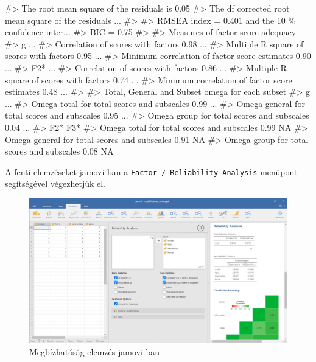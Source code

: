 \documentclass[
  letterpaper,
]{krantz}
\makeatletter
\newenvironment{Shaded}{\begin{snugshade}}{\end{snugshade}}
\newcommand{\CommentTok}[1]{\textcolor[rgb]{0.37,0.37,0.37}{#1}}
\newenvironment{kframe}{%
\medskip{}
\setlength{\fboxsep}{.8em}
 \def\at@end@of@kframe{}%
 \ifinner\ifhmode%
  \def\at@end@of@kframe{\end{minipage}}%
  \begin{minipage}{\columnwidth}%
 \fi\fi%
 \def\FrameCommand##1{\hskip\@totalleftmargin \hskip-\fboxsep
 \colorbox{shadecolor}{##1}\hskip-\fboxsep
     \hskip-\linewidth \hskip-\@totalleftmargin \hskip\columnwidth}%
 \MakeFramed {\advance\hsize-\width
   \@totalleftmargin\z@ \linewidth\hsize
   \@setminipage}}%
 {\par\unskip\endMakeFramed%
 \at@end@of@kframe}
\renewenvironment{Shaded}{\begin{kframe}}{\end{kframe}}
\makeatother
\begin{document}
\begin{Shaded}
\begin{Highlighting}[]
\CommentTok{\#\textgreater{} The root mean square of the residuals is  0.05 }
\CommentTok{\#\textgreater{} The df corrected root mean square of the residuals ...}
\CommentTok{\#\textgreater{} }
\CommentTok{\#\textgreater{} RMSEA index =  0.401  and the 10 \% confidence inter...}
\CommentTok{\#\textgreater{} BIC =  0.75 }
\CommentTok{\#\textgreater{} }
\CommentTok{\#\textgreater{} Measures of factor score adequacy             }
\CommentTok{\#\textgreater{}                                                  g ...}
\CommentTok{\#\textgreater{} Correlation of scores with factors            0.98 ...}
\CommentTok{\#\textgreater{} Multiple R square of scores with factors      0.95 ...}
\CommentTok{\#\textgreater{} Minimum correlation of factor score estimates 0.90 ...}
\CommentTok{\#\textgreater{}                                                F2* ...}
\CommentTok{\#\textgreater{} Correlation of scores with factors            0.86 ...}
\CommentTok{\#\textgreater{} Multiple R square of scores with factors      0.74 ...}
\CommentTok{\#\textgreater{} Minimum correlation of factor score estimates 0.48 ...}
\CommentTok{\#\textgreater{} }
\CommentTok{\#\textgreater{}  Total, General and Subset omega for each subset}
\CommentTok{\#\textgreater{}                                                  g ...}
\CommentTok{\#\textgreater{} Omega total for total scores and subscales    0.99 ...}
\CommentTok{\#\textgreater{} Omega general for total scores and subscales  0.95 ...}
\CommentTok{\#\textgreater{} Omega group for total scores and subscales    0.04 ...}
\CommentTok{\#\textgreater{}                                                F2* F3*}
\CommentTok{\#\textgreater{} Omega total for total scores and subscales    0.99  NA}
\CommentTok{\#\textgreater{} Omega general for total scores and subscales  0.91  NA}
\CommentTok{\#\textgreater{} Omega group for total scores and subscales    0.08  NA}
\end{Highlighting}
\end{Shaded}

A fenti elemzéseket jamovi-ban a
\texttt{Factor\ /\ Reliability\ Analysis} menüpont segítségével
végezhetjük el.

\begin{figure}

{\centering \includegraphics{./images/megbizhatosag_jamovi_kep_02.jpg}

}

\caption{Megbízhatóság elemzés jamovi-ban}

\end{figure}
\end{document}
